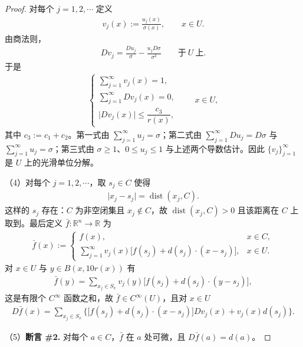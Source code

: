 \documentclass[../../main.tex]{subfiles}%
\begin{document}
\begin{proof}
对每个 $j=1,2,\cdots$ 定义
\begin{align*}
v_j(x):=\frac{u_j(x)}{\sigma(x)},\qquad x\in U.
\end{align*}
由商法则，
\begin{align*}
Dv_j=\frac{Du_j}{\sigma}-\frac{u_jD\sigma}{\sigma^2}\qquad\text{于}\ U\ \text{上}.
\end{align*}
于是
\begin{align*}
\begin{cases}
\displaystyle\sum_{j=1}^{\infty}v_j(x)=1,\\[6pt]
\displaystyle\sum_{j=1}^{\infty}Dv_j(x)=0,\\[6pt]
\lvert Dv_j(x)\rvert\leqslant\dfrac{c_3}{r(x)},
\end{cases}\qquad x\in U,
\end{align*}
其中 $c_3:=c_1+c_2$。第一式由 $\sum_{j=1}^{\infty}u_j=\sigma$；第二式由 $\sum_{j=1}^{\infty}Du_j=D\sigma$ 与 $\sum_{j=1}^{\infty}u_j=\sigma$；第三式由 $\sigma\geqslant1$、$0\leqslant u_j\leqslant1$ 与上述两个导数估计。因此 $\{v_j\}_{j=1}^{\infty}$ 是 $U$ 上的光滑单位分解。

（4）对每个 $j=1,2,\cdots$，取 $s_j\in C$ 使得
\begin{align*}
\lvert x_j-s_j\rvert=\operatorname{dist}(x_j,C).
\end{align*}
这样的 $s_j$ 存在：$C$ 为非空闭集且 $x_j\notin C$，故 $\operatorname{dist}(x_j,C)>0$ 且该距离在 $C$ 上取到。最后定义 $\bar f:\mathbb{R}^n\to\mathbb{R}$ 为
\begin{align*}
\bar f(x):=
\begin{cases}
f(x), & x\in C,\\[4pt]
\displaystyle\sum_{j=1}^{\infty}v_j(x)\bigl[f(s_j)+d(s_j)\cdot(x-s_j)\bigr], & x\in U.
\end{cases}
\end{align*}
对 $x\in U$ 与 $y\in B(x,10r(x))$ 有
\begin{align*}
\bar f(y)=\sum_{x_j\in S_x}v_j(y)\bigl[f(s_j)+d(s_j)\cdot(y-s_j)\bigr],
\end{align*}
这是有限个 $C^{\infty}$ 函数之和，故 $\bar f\in C^{\infty}(U)$，且对 $x\in U$
\begin{align*}
D\bar f(x)=\sum_{x_j\in S_x}\bigl\{\bigl[f(s_j)+d(s_j)\cdot(x-s_j)\bigr]Dv_j(x)+v_j(x)d(s_j)\bigr\}.
\end{align*}

（5）\textbf{断言 \#2.} 对每个 $a\in C$，$\bar f$ 在 $a$ 处可微，且 $D\bar f(a)=d(a)$。


\end{proof}
\end{document}
